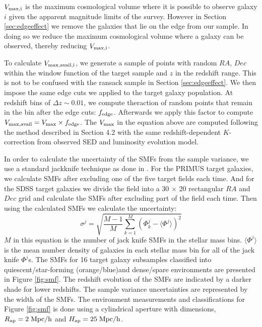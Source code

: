 \documentclass{emulateapj}
\begin{document}
$V_{\rm{max},i}$ is the maximum cosmological volume 
where it is possible to observe galaxy $i$ given the apparent 
magnitude limits of the survey. However in Section \ref{sec:edgeeffect} 
we remove the galaxies that lie on the edge from our sample. 
In doing so we reduce the maximum cosmological volume 
where a galaxy can be observed, thereby reducing $V_{\rm{max},i}$.

To calculate $V_{\rm{max,avail},i}$, we generate a sample of 
points with random $RA$, $Dec$ within the window function of 
the target sample and $z$ in the redshift range. This is not to be 
confused with the ransack sample in Section \ref{sec:edgeeffect}. 
We then impose the same edge cuts we applied to the target 
galaxy population. At redshift bins of $\Delta z \sim 0.01$, we 
compute theraction of random points that remain in the bin after 
the edge cuts: $f_{\rm{edge}}$. Afterwards we apply this factor to 
compute $V_{\rm{max,avail}} = V_{\rm{max}} \times f_{\rm{edge}}$. 
The $V_{\rm{max}}$ in the equation above are computed following 
the method described in \cite{Moustakas:2013aa} Section 4.2 with 
the same redshift-dependent $K$-correction from observed SED 
and luminosity evolution model.

In order to calculate the uncertainty of the SMFs from the sample 
variance, we use a standard jackknife technique as done in \cite{Moustakas:2013aa}.
For the PRIMUS target galaxies, we calculate SMFs after excluding 
one of the five target fields each time. And for the SDSS target galaxies
we divide the field into a 30 $\times$ 20 rectangular $RA$ and $Dec$ 
grid and calculate the SMFs after excluding part of the field each time. 
Then using the calculated SMFs we calculate the uncertainty: 
\begin{equation}
\sigma^j = \sqrt{\frac{M-1}{M} \sum\limits_{k=1}^{M} (\Phi^j_k - \langle \Phi^j \rangle)^2}
\end{equation} 
$M$ in this equation is the number of jack knife SMFs in the stellar mass
bins. $\langle \Phi^j \rangle$ is the mean number density of galaxies 
in each stellar mass bin for all of the jack knife $\Phi^j$s. The SMFs for 
16 target galaxy subsamples classified into quiescent/star-forming (orange/blue)and 
dense/spare environments are presented in Figure \ref{fig:smf}. The 
redshift evolution of the SMFs are indicated by a darker shade for lower
redshifts. The sample variance uncertainties are represented by the 
width of the SMFs. The environment measurements and classifications
for Figure \ref{fig:smf} is done using a cylindrical aperture with dimensions,
$R_{\rm{ap}} = 2 \; \rm{Mpc}/h$ and $H_{\rm{ap}} = 25 \; \rm{Mpc}/h$. 
\end{document}

